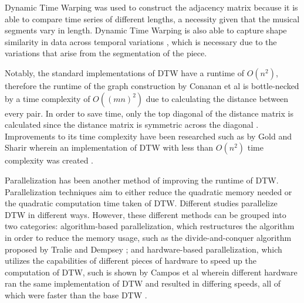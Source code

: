 Dynamic Time Warping was used to construct the adjacency matrix because it is able to compare time series of different lengths, a necessity given that the musical segments vary in length. Dynamic Time Warping is also able to capture shape similarity in data across temporal variations \cite{paparrizos}, which is necessary due to the variations that arise from the segmentation of the piece.   

Notably, the standard implementations of DTW have a runtime of $O(n^2)$, therefore the runtime of the graph construction by Conanan et al is bottle-necked by a time complexity of $O((mn)^2)$ due to calculating the distance between every pair. In order to save  time, only the top diagonal of the distance matrix is calculated since the distance matrix is symmetric across the diagonal \cite{ConananEtAl}. Improvements to its time complexity have been researched such as by Gold and Sharir wherein an implementation of DTW with less than $O(n^2)$ time complexity was created \cite{OmerGold}.

Parallelization has been another method of improving the runtime of DTW. Parallelization techniques aim to either reduce the quadratic memory needed or the quadratic computation time taken of DTW. Different studies parallelize DTW in different ways. However, these different methods can be grouped into two categories: algorithm-based parallelization, which restructures the algorithm in order to reduce the memory usage, such as the divide-and-conquer algorithm proposed by Tralie and Dempsey \cite{TralieDempsey}; and hardware-based parallelization, which utilizes the capabilities of different pieces of hardware to speed up the computation of DTW, such is shown by Campos et al \cite{GPUParallelization} wherein different hardware ran the same implementation of DTW and resulted in differing speeds, all of which were faster than the base DTW .





